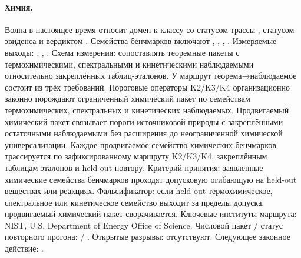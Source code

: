 \paragraph{Химия.}
Волна  в настоящее время относит домен к классу  со статусом трассы , статусом эвиденса  и вердиктом .
Семейства бенчмарков включают , \allowbreak {}, \allowbreak {}, \allowbreak {}.
Измеряемые выходы: , \allowbreak {}, \allowbreak {}.
Схема измерения: сопоставлять теоремные пакеты с термохимическими, спектральными и кинетическими наблюдаемыми относительно закреплённых таблиц-эталонов.
У маршрут теорема→наблюдаемое состоит из трёх требований. Пороговые операторы K2/K3/K4 организационно законно порождают ограниченный химический пакет по семействам термохимических, спектральных и кинетических наблюдаемых. Продвигаемый химический пакет связывает пороги источниковой природы с закреплёнными остаточными наблюдаемыми без расширения до неограниченной химической универсализации. Каждое продвигаемое семейство химических бенчмарков трассируется по зафиксированному маршруту K2/K3/K4, закреплённым таблицам эталонов и held-out повтору.
Критерий принятия: заявленные химические семейства бенчмарков проходят допусковую огибающую на held-out веществах или реакциях.
Фальсификатор: если held-out термохимическое, спектральное или кинетическое семейство выходит за пределы допуска, продвигаемый химический пакет сворачивается.
Ключевые институты маршрута: NIST, \allowbreak U.S. Department of Energy Office of Science.
Числовой пакет / статус повторного прогона:  / .
Открытые разрывы: отсутствуют.
Следующее законное действие: .

